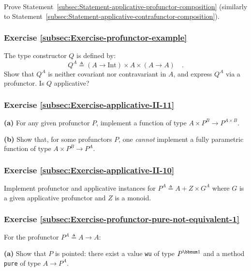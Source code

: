 Prove Statement~\ref{subsec:Statement-applicative-profunctor-composition}
(similarly to Statement~\ref{subsec:Statement-applicative-contrafunctor-composition}).

\subsubsection{Exercise \label{subsec:Exercise-profunctor-example}\ref{subsec:Exercise-profunctor-example}}

The type constructor $Q$ is defined by: 
\[
Q^{A}\triangleq\left(A\rightarrow\text{Int}\right)\times A\times\left(A\rightarrow A\right)\quad.
\]
Show that $Q^{A}$ is neither covariant nor contravariant in $A$,
and express $Q^{A}$ via a profunctor. Is $Q$ applicative?

\subsubsection{Exercise \label{subsec:Exercise-applicative-II-11}\ref{subsec:Exercise-applicative-II-11}}

\textbf{(a)} For any given profunctor $P$, implement a function of
type $A\times P^{B}\rightarrow P^{A\times B}$. 

\textbf{(b)} Show that, for some profunctors $P$, one \emph{cannot}
implement a fully parametric function of type $A\times P^{B}\rightarrow P^{A}$.

\subsubsection{Exercise \label{subsec:Exercise-applicative-II-10}\ref{subsec:Exercise-applicative-II-10}}

Implement profunctor and applicative instances for $P^{A}\triangleq A+Z\times G^{A}$
where $G$ is a given applicative profunctor and $Z$ is a monoid.

\subsubsection{Exercise \label{subsec:Exercise-profunctor-pure-not-equivalent-1}\ref{subsec:Exercise-profunctor-pure-not-equivalent-1}}

For the profunctor $P^{A}\triangleq A\rightarrow A$:

\textbf{(a)} Show that $P$ is pointed: there exist a value \lstinline!wu!
of type $P^{\bbnum 1}$ and a method \lstinline!pure! of type $A\rightarrow P^{A}$. 

